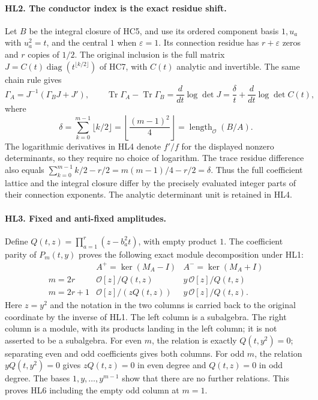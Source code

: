 \paragraph{HL2. The conductor index is the exact residue shift.}
Let $B$ be the integral closure of HC5, and use its ordered
component basis $1,u_a$ with $u_a^2=t$, and the central $1$ when
$\varepsilon=1$. Its connection residue has $r+\varepsilon$
zeros and $r$ copies of $1/2$. The original inclusion is the full
matrix $J=C(t)\operatorname{diag}(t^{\lfloor k/2\rfloor})$ of HC7,
with $C(t)$ analytic and invertible. The same chain rule gives
\[
 \Gamma_A=J^{-1}(\Gamma_BJ+J'),\qquad
 \operatorname{Tr}\Gamma_A-\operatorname{Tr}\Gamma_B
    =\frac d{dt}\log\det J
    =\frac{\delta}{t}+\frac d{dt}\log\det C(t),
 \tag{HL4}
\]
where
\[
 \delta=\sum_{k=0}^{m-1}\lfloor k/2\rfloor
   =\left\lfloor\frac{(m-1)^2}{4}\right\rfloor
   =\operatorname{length}_{\mathcal O}(B/A).
 \tag{HL5}
\]
The logarithmic derivatives in HL4 denote $f'/f$ for the displayed
nonzero determinants, so they require no choice of logarithm.
The trace residue difference also equals
$\sum_{k=0}^{m-1}k/2-r/2=m(m-1)/4-r/2=\delta$.
Thus the full coefficient lattice and the integral closure differ
by the precisely evaluated integer parts of their connection
exponents. The analytic determinant unit is retained in HL4.

\paragraph{HL3. Fixed and anti-fixed amplitudes.}
Define $Q(t,z)=\prod_{a=1}^r(z-b_a^2t)$, with empty product $1$.
The coefficient parity of $P_m(t,y)$ proves the following exact
module decomposition under HL1:
\[
 \begin{array}{c|c|c}
 & A^+=\ker(M_A-I)&A^-=\ker(M_A+I)\\ \hline
 m=2r&\mathcal O[z]/Q(t,z)&y\,\mathcal O[z]/Q(t,z)\\
 m=2r+1&\mathcal O[z]/(zQ(t,z))&y\,\mathcal O[z]/Q(t,z).
 \end{array}
 \tag{HL6}
\]
Here $z=y^2$ and the notation in the two columns is carried back
to the original coordinate by the inverse of HL1. The left column
is a subalgebra. The right column is a module, with its products
landing in the left column; it is not asserted to be a subalgebra.
For even $m$, the relation is exactly $Q(t,y^2)=0$; separating
even and odd coefficients gives both columns. For odd $m$, the
relation $yQ(t,y^2)=0$ gives $zQ(t,z)=0$ in even degree and
$Q(t,z)=0$ in odd degree. The bases $1,y,\ldots,y^{m-1}$ show
that there are no further relations. This proves HL6 including
the empty odd column at $m=1$.

